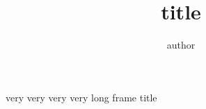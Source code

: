 \documentclass[compress]{beamer}
\title{title}
\author{author}
\begin{document}
\begin{frame}{}
very very very very long frame title
\end{frame}
\end{document}
